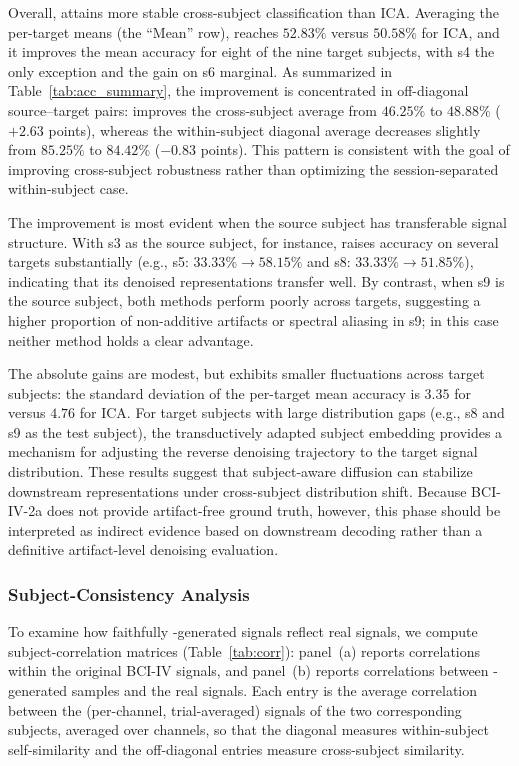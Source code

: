 Overall, \saddpm{} attains more stable cross-subject classification than ICA.
Averaging the per-target means (the ``Mean'' row), \saddpm{} reaches
$52.83\%$ versus $50.58\%$ for ICA, and it improves the mean accuracy for eight
of the nine target subjects, with s4 the only exception and the gain on s6
marginal. As summarized in Table~\ref{tab:acc_summary}, the improvement is
concentrated in off-diagonal source--target pairs: \saddpm{} improves the
cross-subject average from $46.25\%$ to $48.88\%$ ($+2.63$ points), whereas the
within-subject diagonal average decreases slightly from $85.25\%$ to $84.42\%$
($-0.83$ points). This pattern is consistent with the goal of improving
cross-subject robustness rather than optimizing the session-separated
within-subject case.

The improvement is most evident when the source subject has transferable signal
structure. With s3 as the source subject, for instance, \saddpm{} raises
accuracy on several targets substantially (e.g., s5: $33.33\%\rightarrow58.15\%$
and s8: $33.33\%\rightarrow51.85\%$), indicating that its denoised
representations transfer well. By contrast, when s9 is the source subject, both
methods perform poorly across targets, suggesting a higher proportion of
non-additive artifacts or spectral aliasing in s9; in this case neither method
holds a clear advantage.

The absolute gains are modest, but \saddpm{} exhibits smaller fluctuations across
target subjects: the standard deviation of the per-target mean accuracy is
$3.35$ for \saddpm{} versus $4.76$ for ICA. For target subjects with large
distribution gaps (e.g., s8 and s9 as the test subject), the transductively
adapted subject embedding provides a mechanism for adjusting the reverse
denoising trajectory to the target signal distribution. These results suggest
that subject-aware diffusion can stabilize downstream representations under
cross-subject distribution shift. Because BCI-IV-2a does not provide
artifact-free ground truth, however, this phase should be interpreted as
indirect evidence based on downstream decoding rather than a definitive
artifact-level denoising evaluation.

\subsubsection{Subject-Consistency Analysis}
To examine how faithfully \saddpm{}-generated signals reflect real signals, we
compute subject-correlation matrices (Table~\ref{tab:corr}): panel~(a) reports
correlations within the original BCI-IV signals, and panel~(b) reports
correlations between \saddpm{}-generated samples and the real signals. Each entry
is the average correlation between the (per-channel, trial-averaged) signals of
the two corresponding subjects, averaged over channels, so that the diagonal
measures within-subject self-similarity and the off-diagonal entries measure
cross-subject similarity.

